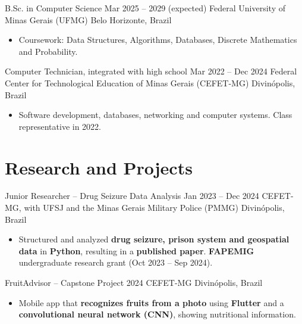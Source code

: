 \documentclass[10pt,a4paper]{article}
\begin{document}
\entry
{B.Sc. in Computer Science}
{Mar 2025 -- 2029 (expected)}
{Federal University of Minas Gerais (UFMG)}
{Belo Horizonte, Brazil}

\begin{itemize}
    \item Coursework: Data Structures, Algorithms, Databases, Discrete Mathematics and Probability.
\end{itemize}

\entry
{Computer Technician, integrated with high school}
{Mar 2022 -- Dec 2024}
{Federal Center for Technological Education of Minas Gerais (CEFET-MG)}
{Divinópolis, Brazil}

\begin{itemize}
    \item Software development, databases, networking and computer systems. Class representative in 2022.
\end{itemize}

\section*{Research and Projects}

\entry
{Junior Researcher -- Drug Seizure Data Analysis}
{Jan 2023 -- Dec 2024}
{CEFET-MG, with UFSJ and the Minas Gerais Military Police (PMMG)}
{Divinópolis, Brazil}

\begin{itemize}

    \item Structured and analyzed \textbf{drug seizure, prison system and geospatial data} in
    \textbf{Python}, resulting in a \textbf{published paper}. \textbf{FAPEMIG} undergraduate
    research grant (Oct 2023 -- Sep 2024).

\end{itemize}

\entry
{FruitAdvisor -- Capstone Project}
{2024}
{CEFET-MG}
{Divinópolis, Brazil}

\begin{itemize}

    \item Mobile app that \textbf{recognizes fruits from a photo} using \textbf{Flutter} and a \textbf{convolutional neural network (CNN)}, showing nutritional information.

\end{itemize}

\end{document}
